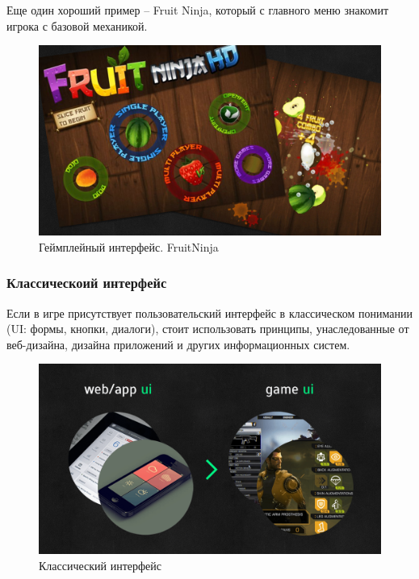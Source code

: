 \documentclass{article}
\begin{document}
Еще один хороший пример -- Fruit Ninja, который с главного меню знакомит игрока с базовой механикой.

\begin{figure}[H]
  \includegraphics[width=\textwidth]{res/img/fruitNinja.png}
  \caption{Геймплейный интерфейс. FruitNinja}
\end{figure}

\subsubsection*{Классическоий интерфейс}
Если в игре присутствует пользовательский интерфейс в классическом понимании (UI: формы, кнопки, диалоги), стоит использовать принципы, унаследованные от веб-дизайна, дизайна приложений и других информационных систем.

\begin{figure}[H]
  \includegraphics[width=\textwidth]{res/img/classicalUi.png}
  \caption{Классический интерфейс}
\end{figure}
\end{document}
